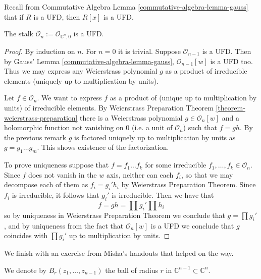 \noindent
Recall from Commutative Algebra Lemma
\ref{commutative-algebra-lemma-gauss}
that if $R$ is a UFD, then $R[x]$ is a UFD.

\begin{lemma}
\label{lemma-stalk-is-ufd}
The stalk
$\mathcal{O}_n:=\mathcal{O}_{\mathbb{C}^n,0}$
is a UFD.
\end{lemma}

\begin{proof}
By induction on $n$. For $n=0$ it is trivial.
Suppose $\mathcal{O}_{n-1}$ is a
UFD. Then by Gauss' Lemma
\ref{commutative-algebra-lemma-gauss},
$\mathcal{O}_{n-1}[w]$ is a UFD
too. Thus we may express any Weierstrass
polynomial $g$ as a product of
irreducible elements (uniquely up to
multiplication by units).

Let $f\in \mathcal{O}_n$. We want to express
$f$ as a product of (unique up to
multiplication by units) of irreducible
elements. By Weierstrass Preparation
Theorem \ref{theorem-weierstrass-preparation}
there is a Weierstrass polynomial
$g\in\mathcal{O}_n[w]$ and a holomorphic
function not vanishing on $0$ (i.e. a
unit of $\mathcal{O}_n$) such that $f=gh$. By
the previous remark $g$ is
factored uniquely up to multiplication by
units as $g=g_1\ldots g_m$. This shows
existence of the factorization.

To prove uniqueness suppose that $f=f_1\ldots
f_k$ for some irreducible
$f_1,\ldots,f_k\in\mathcal{O}_n$. Since $f$
does not vanish in the $w$ axis,
neither can each $f_i$, so that we may
decompose each of them as  $f_i=g_i'h_i$
by Weierstrass Preparation Theorem. Since
$f_i$ is irreducible, it follows that
$g_i'$ is irreducible. Then we have that $$
f=gh=\prod g_i'\prod h_i $$ so by
uniqueness in Weierstrass Preparation Theorem
we conclude that $g=\prod g_i'$,
and by uniqueness from the fact that
$\mathcal{O}_n[w]$ is a UFD we conclude
that $g$ coincides with $\prod g_i'$ up to
multiplication by units.
\end{proof}

\medskip\noindent
We finish with an exercise from Misha's
handouts
that helped on the way.

We denote by $B_r(z_1,\ldots,z_{n-1})$ the
ball of radius $r$ in
$\mathbb{C}^{n-1}\subset\mathbb{C}^n$.

